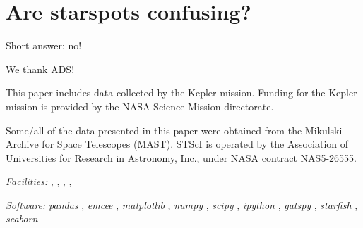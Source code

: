 \documentclass[twocolumn]{emulateapj}%
\newcommand{\project}[1]{\textsl{#1}}
\begin{document}
\clearpage
\pagebreak


\appendix

\section{Are starspots confusing?}
\label{methods-details}

Short answer: no!

\acknowledgements

We thank ADS!

This paper includes data collected by the Kepler mission. Funding for the Kepler mission is provided by the NASA Science Mission directorate.

Some/all of the data presented in this paper were obtained from the Mikulski Archive for Space Telescopes (MAST). STScI is operated by the Association of Universities for Research in Astronomy, Inc., under NASA contract NAS5-26555.


{\it Facilities:} , , , , 

{\it Software: }
 \project{pandas} \citep{mckinney10},
 \project{emcee} \citep{foreman13},
 \project{matplotlib} \citep{hunter07},
 \project{numpy} \citep{vanderwalt11},
 \project{scipy} \citep{jones01},
 \project{ipython} \citep{perez07},
 \project{gatspy} \citep{JakeVanderplas2015},
 \project{starfish} \citep{czekala15},
 \project{seaborn} \citep{waskom14}

\clearpage



\end{document}
